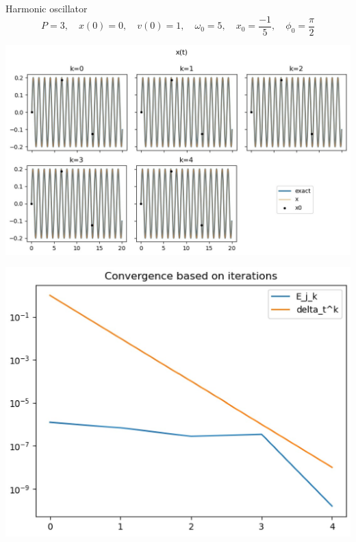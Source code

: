 \begin{frame}[allowframebreaks]{Harmonic oscillator}
	$$P=3, \quad x(0)=0,\quad v(0)=1, \quad\omega_0=5, \quad x_0=\frac{-1}{5}, \quad \phi_0=\frac{\pi}{2}$$
	\begin{minipage}{0.6\linewidth}
		\centering
		\includegraphics[width=\linewidth]{"images/parareal/osci_1.jpg"}
	\end{minipage} \;
	\begin{minipage}{0.38\linewidth}
		\centering
		\includegraphics[width=\linewidth]{"images/parareal/osci_cvg_1.jpg"}
	\end{minipage}
	
\end{frame}

